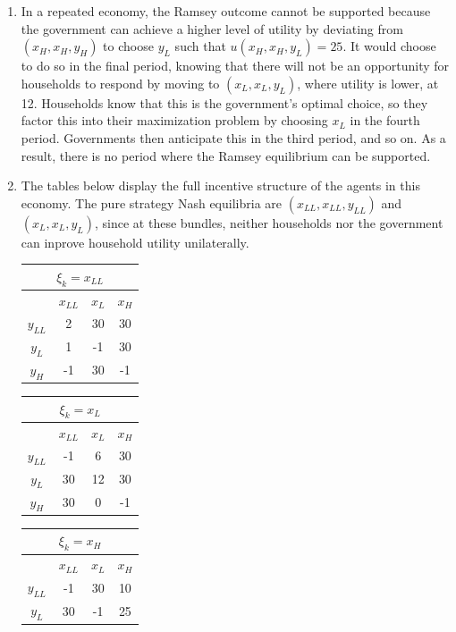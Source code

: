 \documentclass{article}
\begin{document}
\begin{enumerate}
	\item In a repeated economy, the Ramsey outcome cannot be supported because the government can achieve a higher level of utility by deviating from $(x_H,x_H,y_H)$ to choose $y_L$ such that $u(x_H,x_H,y_L)=25$. It would choose to do so in the final period, knowing that there will not be an opportunity for households to respond by moving to $(x_L,x_L,y_L)$, where utility is lower, at 12. Households know that this is the government's optimal choice, so they factor this into their maximization problem by choosing $x_L$ in the fourth period. Governments then anticipate this in the third period, and so on. As a result, there is no period where the Ramsey equilibrium can be supported.
	
	\item  The tables below display the full incentive structure of the agents in this economy. The pure strategy Nash equilibria are $(x_{LL},x_{LL},y_{LL})$ and $(x_L,x_L,y_L)$, since at these bundles, neither households nor the government can inprove household utility unilaterally.
		\begin{center}
			\begin{tabular}{|c|c|c|c|}
				\multicolumn{4}{c}{$\xi_k=x_{LL}$}	\\ \hline
						&$x_{LL}$ & $x_L$ & $x_H$ \\ \hline 
			$y_{LL}$	& 2 	 & 30 	 & 30	\\ \hline
			$y_L$		& 1 	 & -1 	 & 30	\\ \hline
			$y_H$		& -1  	 & 30 	 & -1	\\ \hline
			\end{tabular} \quad
			\begin{tabular}{|c|c|c|c|}
				\multicolumn{4}{c}{$\xi_k=x_L$}	\\ \hline
						&$x_{LL}$ & $x_L$ & $x_H$ \\ \hline 
			$y_{LL}$	& -1 	 & 6 	 & 30	\\ \hline
			$y_L$		& 30 	 & 12 	 & 30	\\ \hline
			$y_H$		& 30  	 & 0 	 & -1	\\ \hline
			\end{tabular} \quad
			\begin{tabular}{|c|c|c|c|}
				\multicolumn{4}{c}{$\xi_k=x_H$}	\\ \hline
						&$x_{LL}$ & $x_L$ & $x_H$ \\ \hline 
			$y_{LL}$	& -1 	 & 30 	 & 10	\\ \hline
			$y_L$		& 30 	 & -1 	 & 25	\\ \hline

\end{tabular}
\end{center}
\end{enumerate}
\end{document}

